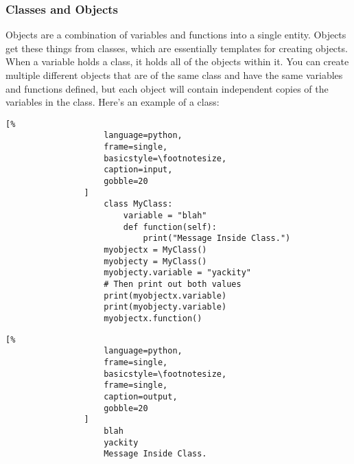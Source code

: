 \documentclass[crop=false,class=article,oneside]{standalone}
\begin{document}
        \subsubsection{Classes and Objects}
            Objects are a combination of variables and functions into
            a single entity. Objects get these things from classes,
            which are essentially templates for creating objects.
            When a variable holds a class, it holds all of the
            objects within it. You can create multiple different
            objects that are of the same class and have the same
            variables and functions defined, but each object will
            contain independent copies of the variables in the class.
            Here's an example of a class:\newline
            \begin{minipage}[t]{.48\textwidth}
                \centering
                \begin{lstlisting}[%
                    language=python,
                    frame=single,
                    basicstyle=\footnotesize,
                    caption=input,
                    gobble=20
                ]
                    class MyClass:
                        variable = "blah"
                        def function(self):
                            print("Message Inside Class.")
                    myobjectx = MyClass()
                    myobjecty = MyClass()
                    myobjecty.variable = "yackity"
                    # Then print out both values
                    print(myobjectx.variable)
                    print(myobjecty.variable)
                    myobjectx.function()
                \end{lstlisting}
            \end{minipage}\hfill
            \begin{minipage}[t]{.48\textwidth}
                \centering
                \begin{lstlisting}[%
                    language=python,
                    frame=single,
                    basicstyle=\footnotesize,
                    frame=single,
                    caption=output,
                    gobble=20
                ]
                    blah
                    yackity
                    Message Inside Class.
                \end{lstlisting}
            \end{minipage}
\end{document}

